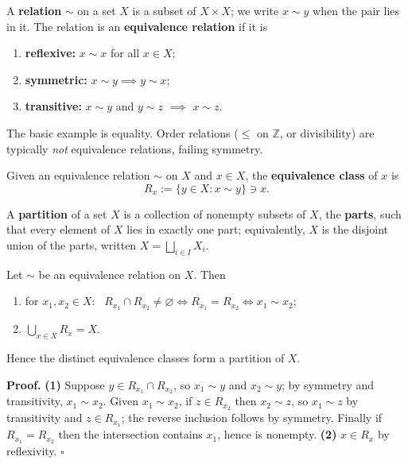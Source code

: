 \documentclass[11pt]{report}
\renewenvironment{proof}[1][Proof]{\noindent\textbf{#1.} }{\hfill$\square$\par\vspace{5pt}}
\begin{document}
\begin{defbox}\label{def:equivalence-relation}
A \textbf{relation} $\sim$ on a set $X$ is a subset of $X \times X$; we write $x \sim y$ when the pair lies in it. The relation is an \textbf{equivalence relation} if it is
\begin{enumerate}
    \item \textbf{reflexive:} $x \sim x$ for all $x \in X$;
    \item \textbf{symmetric:} $x \sim y \implies y \sim x$;
    \item \textbf{transitive:} $x \sim y$ and $y \sim z$ $\implies$ $x \sim z$.
\end{enumerate}
The basic example is equality. Order relations ($\leq$ on $\mathbb{Z}$, or divisibility) are typically \emph{not} equivalence relations, failing symmetry.
\end{defbox}

\begin{defbox}\label{def:equivalence-class}
Given an equivalence relation $\sim$ on $X$ and $x \in X$, the \textbf{equivalence class} of $x$ is
\[ R_x := \{ y \in X : x \sim y \} \ni x. \]
\end{defbox}

\begin{defbox}[Partition]\label{def:partition}
A \textbf{partition} of a set $X$ is a collection of nonempty subsets of $X$, the \textbf{parts}, such that every element of $X$ lies in exactly one part; equivalently, $X$ is the disjoint union of the parts, written $X = \bigsqcup_{i \in I} X_i$.
\end{defbox}

\begin{propbox}\label{prop:equivalence-classes-partition-set}
Let $\sim$ be an equivalence relation on $X$. Then
\begin{enumerate}
    \item for $x_1, x_2 \in X$: \ $R_{x_1} \cap R_{x_2} \neq \varnothing \iff R_{x_1} = R_{x_2} \iff x_1 \sim x_2$;
    \item $\bigcup_{x \in X} R_x = X$.
\end{enumerate}
Hence the distinct equivalence classes form a partition of $X$.
\end{propbox}

\begin{proof}
\textbf{(1)} Suppose $y \in R_{x_1} \cap R_{x_2}$, so $x_1 \sim y$ and $x_2 \sim y$; by symmetry and transitivity, $x_1 \sim x_2$. Given $x_1 \sim x_2$, if $z \in R_{x_2}$ then $x_2 \sim z$, so $x_1 \sim z$ by transitivity and $z \in R_{x_1}$; the reverse inclusion follows by symmetry. Finally if $R_{x_1} = R_{x_2}$ then the intersection contains $x_1$, hence is nonempty. \textbf{(2)} $x \in R_x$ by reflexivity.
\end{proof}
\end{document}
